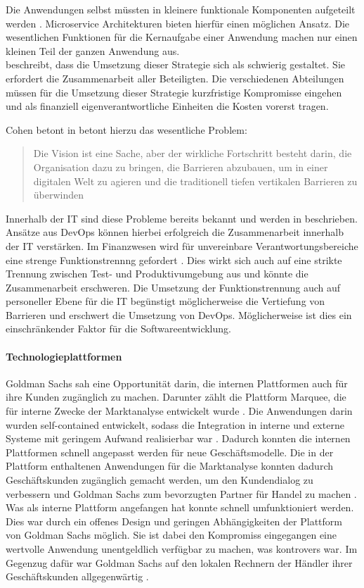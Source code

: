 Die Anwendungen selbst müssten in kleinere funktionale Komponenten aufgeteilt werden \cite{Bussmann2006}. Microservice Architekturen bieten hierfür einen möglichen Ansatz. Die wesentlichen Funktionen für die Kernaufgabe einer Anwendung machen nur einen kleinen Teil der ganzen Anwendung aus.
\medskip
\\
\citet{Gupta:2017} beschreibt, dass die Umsetzung dieser Strategie sich als schwierig gestaltet. Sie erfordert die Zusammenarbeit aller Beteiligten. Die verschiedenen Abteilungen müssen für die Umsetzung dieser Strategie kurzfristige Kompromisse eingehen und als finanziell eigenverantwortliche Einheiten die Kosten vorerst tragen. 

Cohen betont in \cite[Zitat, S.5]{Gupta:2017}
betont hierzu das wesentliche Problem:
\begin{quote}\label{quote:goldman-vision}
    Die Vision ist eine Sache, aber der wirkliche Fortschritt besteht darin, die Organisation dazu zu bringen, die Barrieren abzubauen, um in einer digitalen Welt zu agieren und die traditionell tiefen vertikalen Barrieren zu überwinden
\end{quote}
\medskip
Innerhalb der IT sind diese Probleme bereits bekannt und werden in \citet{Disterer2013} beschrieben. Ansätze aus DevOps \cite{Alt2017} können hierbei erfolgreich die Zusammenarbeit innerhalb der IT verstärken. Im Finanzwesen wird für unvereinbare Verantwortungsbereiche eine strenge Funktionstrennng gefordert \cite{MaRisk:2017}.
Dies wirkt sich auch auf eine strikte Trennung zwischen Test- und Produktivumgebung aus \citet{MaRisk:2017} und könnte die Zusammenarbeit erschweren. Die Umsetzung der Funktionstrennung auch auf personeller Ebene für die IT begünstigt möglicherweise die Vertiefung von Barrieren und erschwert die Umsetzung von DevOps. Möglicherweise ist dies ein einschränkender Faktor für die Softwareentwicklung.

\paragraph{Technologieplattformen}
Goldman Sachs sah eine Opportunität darin, die internen Plattformen auch für ihre Kunden zugänglich zu machen. Darunter zählt die Plattform Marquee, die für interne Zwecke der Marktanalyse entwickelt wurde \cite{Gupta:2017}.
Die Anwendungen darin wurden self-contained entwickelt, sodass die Integration in interne und externe Systeme mit geringem Aufwand realisierbar war \cite{Gupta:2017}. Dadurch konnten die internen Plattformen schnell angepasst werden für neue Geschäftsmodelle. Die in der Plattform enthaltenen Anwendungen für die Marktanalyse konnten dadurch Geschäftskunden zugänglich gemacht werden, um den Kundendialog zu verbessern und Goldman Sachs zum bevorzugten Partner für Handel zu machen \cite{Gupta:2017}.
\medskip
\\
Was als interne Plattform angefangen hat konnte schnell umfunktioniert werden. Dies war durch ein offenes Design und geringen Abhängigkeiten der Plattform von Goldman Sachs möglich. Sie ist dabei den Kompromiss eingegangen eine wertvolle Anwendung unentgeldlich verfügbar zu machen, was kontrovers war. Im Gegenzug dafür war Goldman Sachs auf den lokalen Rechnern der Händler ihrer Geschäftskunden allgegenwärtig \cite{Gupta:2017}.
%

